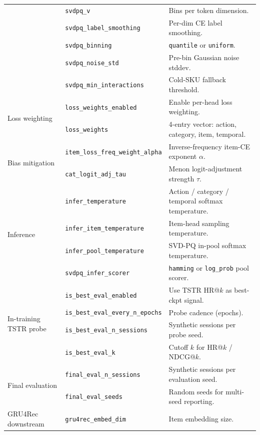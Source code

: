 \documentclass[sigconf,nonacm]{acmart}
\begin{document}
\begin{table}[t]
\begin{tabularx}{\columnwidth}{@{}l l X@{}}
  & \texttt{svdpq\_v}                  & Bins per token dimension. \\
  & \texttt{svdpq\_label\_smoothing}   & Per-dim CE label smoothing. \\
  & \texttt{svdpq\_binning}            & \texttt{quantile} or \texttt{uniform}. \\
  & \texttt{svdpq\_noise\_std}         & Pre-bin Gaussian noise stddev. \\
  & \texttt{svdpq\_min\_interactions}  & Cold-SKU fallback threshold. \\
\midrule
\multirow{2}{*}{Loss weighting}
  & \texttt{loss\_weights\_enabled}     & Enable per-head loss weighting. \\
  & \texttt{loss\_weights}              & 4-entry vector: action, category, item, temporal. \\
\midrule
\multirow{2}{*}{Bias mitigation}
  & \texttt{item\_loss\_freq\_weight\_alpha} & Inverse-frequency item-CE exponent $\alpha$. \\
  & \texttt{cat\_logit\_adj\_tau}            & Menon logit-adjustment strength $\tau$. \\
\midrule
\multirow{4}{*}{Inference}
  & \texttt{infer\_temperature}      & Action / category / temporal softmax temperature. \\
  & \texttt{infer\_item\_temperature} & Item-head sampling temperature. \\
  & \texttt{infer\_pool\_temperature} & SVD-PQ in-pool softmax temperature. \\
  & \texttt{svdpq\_infer\_scorer}    & \texttt{hamming} or \texttt{log\_prob} pool scorer. \\
\midrule
\multirow{4}{*}{In-training TSTR probe}
  & \texttt{is\_best\_eval\_enabled}        & Use TSTR HR@$k$ as best-ckpt signal. \\
  & \texttt{is\_best\_eval\_every\_n\_epochs} & Probe cadence (epochs). \\
  & \texttt{is\_best\_eval\_n\_sessions}    & Synthetic sessions per probe seed. \\
  & \texttt{is\_best\_eval\_k}              & Cutoff $k$ for HR@$k$ / NDCG@$k$. \\
\midrule
\multirow{2}{*}{Final evaluation}
  & \texttt{final\_eval\_n\_sessions} & Synthetic sessions per evaluation seed. \\
  & \texttt{final\_eval\_seeds}       & Random seeds for multi-seed reporting. \\
\midrule
\multirow{6}{*}{GRU4Rec downstream}
  & \texttt{gru4rec\_embed\_dim}      & Item embedding size. \\

\end{tabularx}
\end{table}
\end{document}
